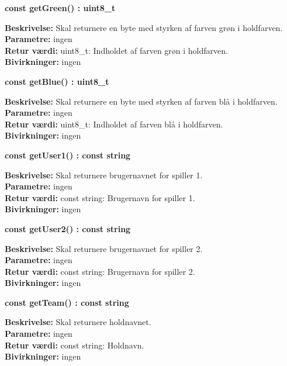 \documentclass[Arkitektur/System_main.tex]{subfiles}
\begin{document}
\textbf{const getGreen() : uint8\_t}
\begin{adjustwidth}{1cm}{0pt}
\textbf{Beskrivelse:} Skal returnere en byte med styrken af farven grøn i holdfarven.\\
\textbf{Parametre:} ingen \\[0.2cm]
\textbf{Retur værdi:} uint8\_t: Indholdet af farven grøn i holdfarven.\\[0.2cm]
\textbf{Bivirkninger:} ingen \\[0.2cm]
\end{adjustwidth}

\textbf{const getBlue() : uint8\_t}
\begin{adjustwidth}{1cm}{0pt}
\textbf{Beskrivelse:} Skal returnere en byte med styrken af farven blå i holdfarven.\\
\textbf{Parametre:} ingen \\[0.2cm]
\textbf{Retur værdi:} uint8\_t: Indholdet af farven blå i holdfarven.\\[0.2cm]
\textbf{Bivirkninger:} ingen \\[0.2cm]
\end{adjustwidth}

\textbf{const getUser1() : const string}
\begin{adjustwidth}{1cm}{0pt}
\textbf{Beskrivelse:} Skal returnere brugernavnet for spiller 1.\\
\textbf{Parametre:} ingen \\[0.2cm]
\textbf{Retur værdi:} const string: Brugernavn for spiller 1.\\[0.2cm]
\textbf{Bivirkninger:} ingen \\[0.2cm]
\end{adjustwidth}

\textbf{const getUser2() : const string}
\begin{adjustwidth}{1cm}{0pt}
\textbf{Beskrivelse:} Skal returnere brugernavnet for spiller 2.\\
\textbf{Parametre:} ingen \\[0.2cm]
\textbf{Retur værdi:} const string: Brugernavn for spiller 2.\\[0.2cm]
\textbf{Bivirkninger:} ingen \\[0.2cm]
\end{adjustwidth}

\textbf{const getTeam() : const string}
\begin{adjustwidth}{1cm}{0pt}
\textbf{Beskrivelse:} Skal returnere holdnavnet.\\
\textbf{Parametre:} ingen \\[0.2cm]
\textbf{Retur værdi:} const string: Holdnavn.\\[0.2cm]
\textbf{Bivirkninger:} ingen \\[0.2cm]
\end{adjustwidth}
\end{document}
